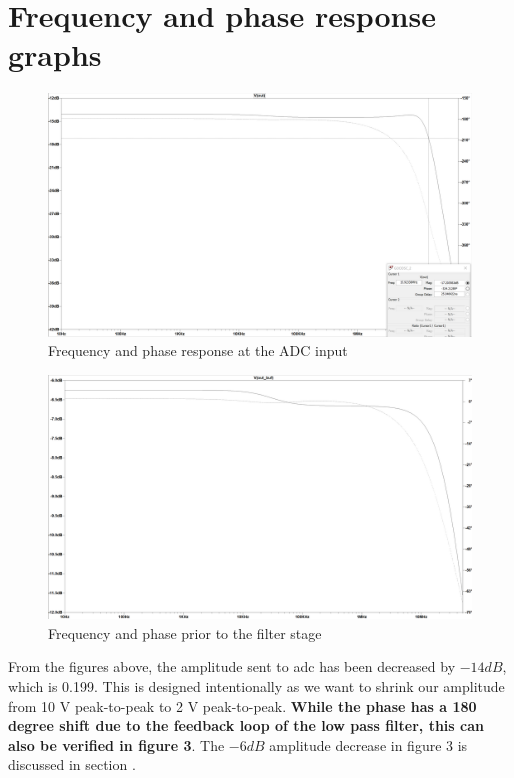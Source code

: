 \documentclass[pdftex,12pt,a4paper]{article}
\begin{document}
\section{Frequency and phase response graphs}
\begin{figure}[H]
\centering
\includegraphics[width=14cm]{F-P-r.png}
\caption{Frequency and phase response at the ADC input}
\end{figure}
\begin{figure}[H]
\centering
\includegraphics[width=14cm]{F-P-f.png}
\caption{Frequency and phase prior to the filter stage}
\end{figure}
From the figures above, the amplitude sent to adc has been decreased by $-14dB$, which is 0.199. This is designed intentionally as we want to shrink our amplitude from 10 V peak-to-peak to 2 V peak-to-peak. \textbf{While the phase has a 180 degree shift due to the feedback loop of the low pass filter, this can also be verified in figure 3}. The $-6dB$ amplitude decrease in figure 3 is discussed in section .
\end{document}
